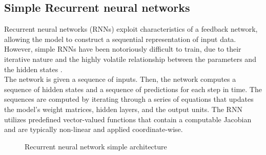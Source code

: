\documentclass[12pt,a4paper]{report}
\begin{document}
\subsection{Simple Recurrent neural networks}
Recurrent neural networks (RNNs) exploit characteristics of a feedback network, allowing the model to construct a sequential representation of input data. However, simple RNNs have been notoriously difficult to train, due to their iterative nature and the highly volatile relationship between the parameters and the hidden states \cite{Bengio}.\\
The network is given a sequence of inputs. Then, the network computes a sequence of hidden states and a sequence of predictions for each step in time. The sequences are computed by iterating through a series of equations that updates the model’s weight matrices, hidden layers, and the output units. The RNN utilizes predefined vector-valued functions that contain a computable Jacobian and are typically non-linear and applied coordinate-wise\cite{Mar}.
\begin{figure}[H]
  \centering
  \caption{Recurrent neural network simple architecture\cite{LSTM}}
\end{figure}
\end{document}
